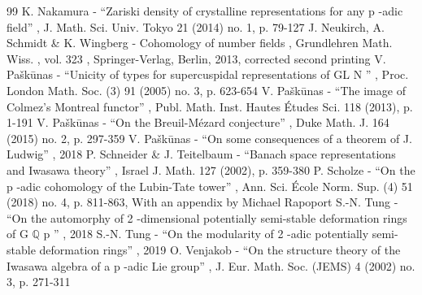 \documentclass[11pt]{article}
\begin{document}
\begin{thebibliography}{99}
 K. Nakamura - “Zariski density of crystalline representations for any p -adic field” , J. Math. Sci. Univ. Tokyo 21 (2014) no. 1, p. 79-127
 J. Neukirch, A. Schmidt \& K. Wingberg - Cohomology of number fields , Grundlehren Math. Wiss. , vol. 323 , Springer-Verlag, Berlin, 2013, corrected second printing
 V. Paškūnas - “Unicity of types for supercuspidal representations of GL N ” , Proc. London Math. Soc. (3) 91 (2005) no. 3, p. 623-654
 V. Paškūnas - “The image of Colmez’s Montreal functor” , Publ. Math. Inst. Hautes Études Sci. 118 (2013), p. 1-191
 V. Paškūnas - “On the Breuil-Mézard conjecture” , Duke Math. J. 164 (2015) no. 2, p. 297-359
 V. Paškūnas - “On some consequences of a theorem of J. Ludwig” , 2018
 P. Schneider \& J. Teitelbaum - “Banach space representations and Iwasawa theory” , Israel J. Math. 127 (2002), p. 359-380
 P. Scholze - “On the p -adic cohomology of the Lubin-Tate tower” , Ann. Sci. École Norm. Sup. (4) 51 (2018) no. 4, p. 811-863, With an appendix by Michael Rapoport
 S.-N. Tung - “On the automorphy of 2 -dimensional potentially semi-stable deformation rings of G \(\mathbb Q\) p ” , 2018
 S.-N. Tung - “On the modularity of 2 -adic potentially semi-stable deformation rings” , 2019
 O. Venjakob - “On the structure theory of the Iwasawa algebra of a p -adic Lie group” , J. Eur. Math. Soc. (JEMS) 4 (2002) no. 3, p. 271-311
\end{thebibliography}
\end{document}
